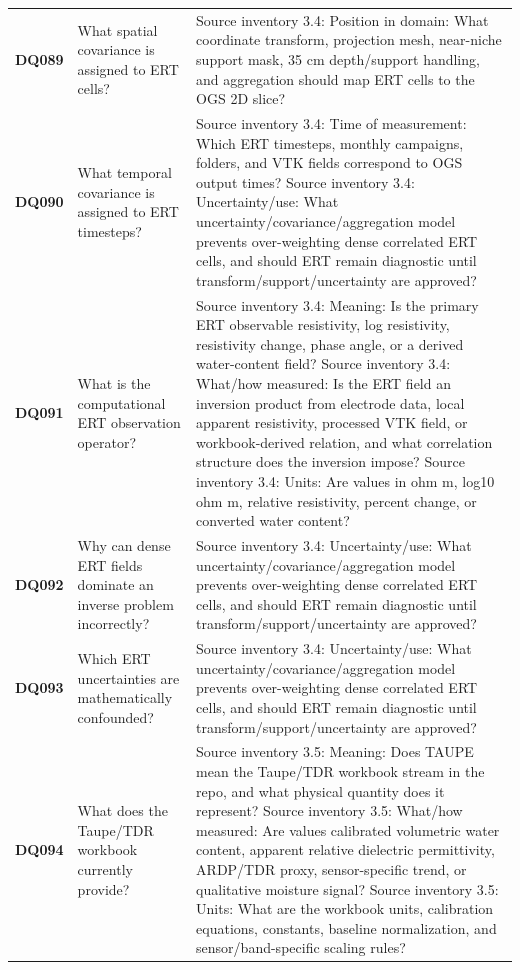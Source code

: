 \begin{longtable}{@{}L{0.09\textwidth} L{0.31\textwidth} L{0.52\textwidth}@{}}
\addlinespace[0.18em]
\textbf{DQ089} & What spatial covariance is assigned to ERT cells? & Source inventory 3.4: Position in domain: What coordinate transform, projection mesh, near-niche support mask, 35 cm depth/support handling, and aggregation should map ERT cells to the OGS 2D slice?\\
\addlinespace[0.18em]
\textbf{DQ090} & What temporal covariance is assigned to ERT timesteps? & Source inventory 3.4: Time of measurement: Which ERT timesteps, monthly campaigns, folders, and VTK fields correspond to OGS output times? Source inventory 3.4: Uncertainty/use: What uncertainty/covariance/aggregation model prevents over-weighting dense correlated ERT cells, and should ERT remain diagnostic until transform/support/uncertainty are approved?\\
\addlinespace[0.18em]
\textbf{DQ091} & What is the computational ERT observation operator? & Source inventory 3.4: Meaning: Is the primary ERT observable resistivity, log resistivity, resistivity change, phase angle, or a derived water-content field? Source inventory 3.4: What/how measured: Is the ERT field an inversion product from electrode data, local apparent resistivity, processed VTK field, or workbook-derived relation, and what correlation structure does the inversion impose? Source inventory 3.4: Units: Are values in ohm m, log10 ohm m, relative resistivity, percent change, or converted water content?\\
\addlinespace[0.18em]
\textbf{DQ092} & Why can dense ERT fields dominate an inverse problem incorrectly? & Source inventory 3.4: Uncertainty/use: What uncertainty/covariance/aggregation model prevents over-weighting dense correlated ERT cells, and should ERT remain diagnostic until transform/support/uncertainty are approved?\\
\addlinespace[0.18em]
\textbf{DQ093} & Which ERT uncertainties are mathematically confounded? & Source inventory 3.4: Uncertainty/use: What uncertainty/covariance/aggregation model prevents over-weighting dense correlated ERT cells, and should ERT remain diagnostic until transform/support/uncertainty are approved?\\
\addlinespace[0.18em]
\textbf{DQ094} & What does the Taupe/TDR workbook currently provide? & Source inventory 3.5: Meaning: Does TAUPE mean the Taupe/TDR workbook stream in the repo, and what physical quantity does it represent? Source inventory 3.5: What/how measured: Are values calibrated volumetric water content, apparent relative dielectric permittivity, ARDP/TDR proxy, sensor-specific trend, or qualitative moisture signal? Source inventory 3.5: Units: What are the workbook units, calibration equations, constants, baseline normalization, and sensor/band-specific scaling rules?\\

\end{longtable}
